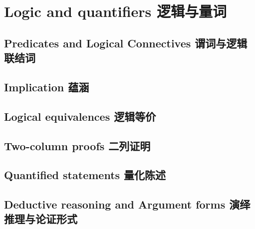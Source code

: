 \chapter{Logic and quantifiers 逻辑与量词}

\section{Predicates and Logical Connectives 谓词与逻辑联结词}




\newpage

\section{Implication 蕴涵}




\newpage

\section{Logical equivalences 逻辑等价}




\newpage
\section{Two-column proofs 二列证明}




\newpage

\section{Quantified statements 量化陈述}




\newpage

\section{Deductive reasoning and Argument forms 演绎推理与论证形式}

